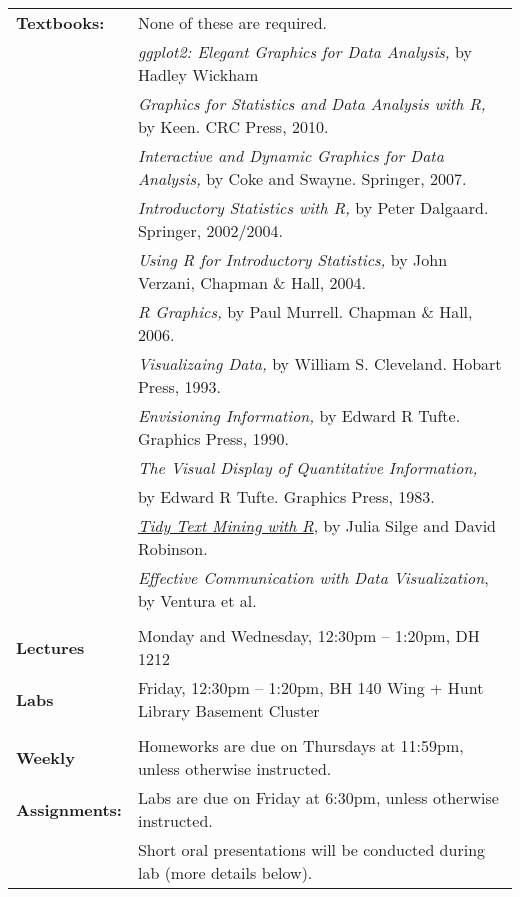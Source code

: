 \documentclass[11pt]{article}
\begin{document}
\begin{tabular}{ll}
{\bf Textbooks:} 
& None of these are required.\\
& {\it ggplot2: Elegant Graphics for Data Analysis,} by Hadley Wickham\\
& {\it Graphics for Statistics and Data Analysis with R,} by Keen.  CRC Press, 2010.\\
& {\it Interactive and Dynamic Graphics for Data Analysis,} by Coke and Swayne.  Springer, 2007.\\
& {\it Introductory Statistics with R,} by Peter Dalgaard.  Springer, 2002/2004.\\
& {\it Using R for Introductory Statistics,} by John Verzani, Chapman \& Hall, 2004.\\
& {\it R Graphics,} by Paul Murrell.  Chapman \& Hall, 2006.\\
& {\it Visualizaing Data,} by William S. Cleveland.  Hobart Press, 1993.\\
& {\it Envisioning Information,} by Edward R Tufte.  Graphics Press, 1990.\\
& {\it The Visual Display of Quantitative Information,} \\ & by Edward R Tufte.  Graphics Press, 1983.\\
& {\it \href{http://tidytextmining.com/}{Tidy Text Mining with R}}, by Julia Silge and David Robinson.\\
& {\it Effective Communication with Data Visualization}, by Ventura et al.\\
& \\



{\bf Lectures}
& Monday and Wednesday, 12:30pm -- 1:20pm, DH 1212\\


{\bf Labs}
& Friday, 12:30pm -- 1:20pm, BH 140 Wing + Hunt Library Basement Cluster\\

\vspace*{.05in}\\



 {\bf Weekly} & Homeworks are due on Thursdays at 11:59pm, unless otherwise instructed.\\
 {\bf Assignments:}
& Labs are due on Friday at 6:30pm, unless otherwise instructed.\\
& Short oral presentations will be conducted during lab (more details below).\\


\end{tabular}
\end{document}
